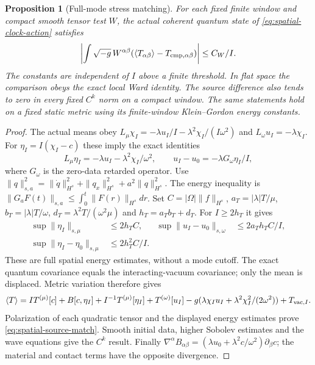 \documentclass[12pt,a4paper]{article}
\newtheorem{proposition}[theorem]{Proposition}
\begin{document}
\begin{proposition}[Full-mode stress matching]
\label{prop:spatial-clock-matching}
For each fixed finite window and compact smooth tensor test $W$,
the actual coherent quantum state of \eqref{eq:spatial-clock-action}
satisfies
\begin{equation}
 \left|\int\sqrt{-g}\,W^{\alpha\beta}
       (\langle T_{\alpha\beta}\rangle-T_{{\rm cmp},\alpha\beta})\right|
       \le C_W/I.
 \label{eq:spatial-source-match}
\end{equation}
The constants are independent of $I$ above a finite threshold. In flat
space the comparison obeys the exact local Ward identity. The
source difference also tends to zero in every fixed $C^k$ norm on a
compact window. The same statements hold on a fixed static metric
using its finite-window Klein--Gordon energy constants.
\end{proposition}
\begin{proof}
The actual means obey
$L_\mu\chi_I=-\lambda u_I/I-\lambda^2\chi_I/(I\omega^2)$ and
$L_\omega u_I=-\lambda\chi_I$. For
$\eta_I=I(\chi_I-c)$ these imply the exact identities
\[
 L_\mu\eta_I=-\lambda u_I-\lambda^2\chi_I/\omega^2,
 \qquad u_I-u_0=-\lambda G_\omega\eta_I/I,
\]
where $G_\omega$ is the zero-data retarded operator. Use
$\|q\|_{s,a}^2=\|\dot q\|_{H^s}^2+\|q_x\|_{H^s}^2+a^2\|q\|_{H^s}^2$.
The energy inequality is
$\|G_a F(t)\|_{s,a}\le\int_0^t\|F(r)\|_{H^s}dr$.
Set $C=|\Omega|\|f\|_{H^s}$,
$a_T=|\lambda|T/\mu$, $b_T=|\lambda|T/\omega$,
$d_T=\lambda^2T/(\omega^2\mu)$ and $h_T=a_Tb_T+d_T$.
For $I\ge2h_T$ it gives
\begin{align}
 \sup\|\eta_I\|_{s,\mu}&\le2h_TC,&
 \sup\|u_I-u_0\|_{s,\omega}&\le2a_Th_TC/I,\\
 \sup\|\eta_I-\eta_0\|_{s,\mu}&\le2h_T^2C/I.
\end{align}
These are full spatial energy estimates, without a mode cutoff.
The exact quantum covariance equals the interacting-vacuum covariance;
only the mean is displaced. Metric variation therefore gives
\[
 \langle T\rangle=I T^{(\mu)}[c]+B[c,\eta_I]
   +I^{-1}T^{(\mu)}[\eta_I]+T^{(\omega)}[u_I]
   -g(\lambda\chi_Iu_I+\lambda^2\chi_I^2/(2\omega^2))+T_{{\rm vac},I}.
\]
Polarization of each quadratic tensor and the displayed energy
estimates prove \eqref{eq:spatial-source-match}. Smooth initial data,
higher Sobolev estimates and the wave equations give the $C^k$ result.
Finally
$\nabla^\alpha B_{\alpha\beta}
 =(\lambda u_0+\lambda^2c/\omega^2)\partial_\beta c$;
the material and contact terms have the opposite divergence.
\end{proof}
\end{document}
